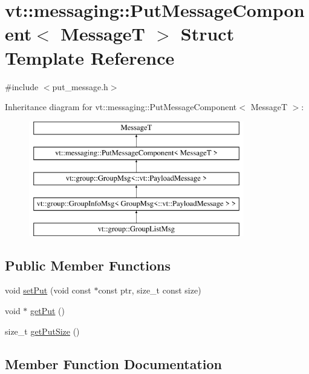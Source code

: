 \hypertarget{structvt_1_1messaging_1_1_put_message_component}{}\section{vt\+:\+:messaging\+:\+:Put\+Message\+Component$<$ MessageT $>$ Struct Template Reference}
\label{structvt_1_1messaging_1_1_put_message_component}


{\ttfamily \#include $<$put\+\_\+message.\+h$>$}

Inheritance diagram for vt\+:\+:messaging\+:\+:Put\+Message\+Component$<$ MessageT $>$\+:\begin{figure}[H]
\begin{center}
\leavevmode
\includegraphics[height=5.000000cm]{structvt_1_1messaging_1_1_put_message_component}
\end{center}
\end{figure}
\subsection*{Public Member Functions}
\begin{DoxyCompactItemize}
\item 
void \hyperlink{structvt_1_1messaging_1_1_put_message_component_a013b0a95bc725bb1f18373e286c077cb}{set\+Put} (void const $\ast$const ptr, size\+\_\+t const size)
\item 
void $\ast$ \hyperlink{structvt_1_1messaging_1_1_put_message_component_ab59f0c0b8330c388722906886841bf0f}{get\+Put} ()
\item 
size\+\_\+t \hyperlink{structvt_1_1messaging_1_1_put_message_component_ae5301d5d0a69192e2d5a3fe822f7406b}{get\+Put\+Size} ()
\end{DoxyCompactItemize}


\subsection{Member Function Documentation}
\mbox{\label{structvt_1_1messaging_1_1_put_message_component_ab59f0c0b8330c388722906886841bf0f}} 
